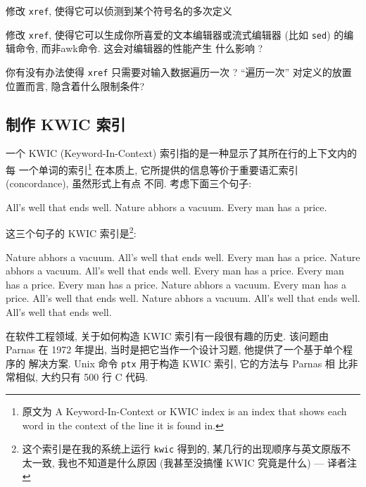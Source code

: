 \begin{exercise}
    修改 \texttt{xref}, 使得它可以侦测到某个符号名的多次定义
\end{exercise}

\begin{exercise}
    修改 \texttt{xref}, 使得它可以生成你所喜爱的文本编辑器或流式编辑器
    (比如 \texttt{sed}) 的编辑命令, 而非awk命令. 这会对编辑器的性能产生
    什么影响 ?
\end{exercise}

\begin{exercise}
    你有没有办法使得 \texttt{xref} 只需要对输入数据遍历一次 ? ``遍历一次''
    对定义的放置位置而言, 隐含着什么限制条件?
\end{exercise}

\subsection{制作 KWIC 索引}
\label{subsec:making_a_kwic_index}

一个 KWIC (Keyword-In-Context) 索引指的是一种显示了其所在行的上下文内的每
一个单词的索引\footnote{原文为 A Keyword-In-Context or KWIC index is an
index that shows each word in the context of the line it is found in.}
在本质上, 它所提供的信息等价于重要语汇索引 (concordance), 虽然形式上有点
不同. 考虑下面三个句子:
\begin{file}
    All's well that ends well.
    Nature abhors a vacuum.
    Every man has a price.
\end{file}
这三个句子的 KWIC 索引是\footnote{这个索引是在我的系统上运行
    \texttt{kwic} 得到的, 某几行的出现顺序与英文原版不太一致,
我也不知道是什么原因 (我甚至没搞懂 KWIC 究竟是什么) --- 译者注}:
\begin{file}
                        Nature  abhors a vacuum.
                                All's well that ends well.
                 Every man has  a price.
                 Nature abhors  a vacuum.
               All's well that  ends well.
                                Every man has a price.
                     Every man  has a price.
                         Every  man has a price.
                                Nature abhors a vacuum.
               Every man has a  price.
                    All's well  that ends well.
               Nature abhors a  vacuum.
          All's well that ends  well.
                         All's  well that ends well.
\end{file}

在软件工程领域, 关于如何构造 KWIC 索引有一段很有趣的历史. 该问题由 Parnas 
在 1972 年提出, 当时是把它当作一个设计习题, 他提供了一个基于单个程序的
解决方案. Unix 命令 \texttt{ptx} 用于构造 KWIC 索引, 它的方法与 Parnas 相
比非常相似, 大约只有 500 行 C 代码.

